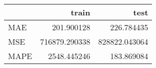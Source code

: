 \begin{tabular}{lrr}
\toprule
{} &          train &           test \\
\midrule
MAE  &     201.900128 &     226.784435 \\
MSE  &  716879.290338 &  828822.043064 \\
MAPE &    2548.445246 &     183.869084 \\
\bottomrule
\end{tabular}

